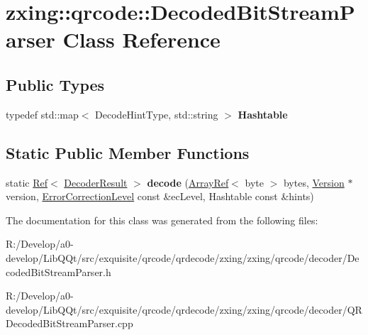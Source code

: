 \hypertarget{classzxing_1_1qrcode_1_1_decoded_bit_stream_parser}{}\section{zxing\+:\+:qrcode\+:\+:Decoded\+Bit\+Stream\+Parser Class Reference}
\label{classzxing_1_1qrcode_1_1_decoded_bit_stream_parser}
\subsection*{Public Types}
\begin{DoxyCompactItemize}
\item 
\mbox{\label{classzxing_1_1qrcode_1_1_decoded_bit_stream_parser_a7390b37faca4378490ad54100f5e540a}} 
typedef std\+::map$<$ Decode\+Hint\+Type, std\+::string $>$ {\bfseries Hashtable}
\end{DoxyCompactItemize}
\subsection*{Static Public Member Functions}
\begin{DoxyCompactItemize}
\item 
\mbox{\label{classzxing_1_1qrcode_1_1_decoded_bit_stream_parser_a1b315d15eadcde4b8c3716ff38f59d30}} 
static \mbox{\hyperlink{classzxing_1_1_ref}{Ref}}$<$ \mbox{\hyperlink{classzxing_1_1_decoder_result}{Decoder\+Result}} $>$ {\bfseries decode} (\mbox{\hyperlink{classzxing_1_1_array_ref}{Array\+Ref}}$<$ byte $>$ bytes, \mbox{\hyperlink{classzxing_1_1qrcode_1_1_version}{Version}} $\ast$version, \mbox{\hyperlink{classzxing_1_1qrcode_1_1_error_correction_level}{Error\+Correction\+Level}} const \&ec\+Level, Hashtable const \&hints)
\end{DoxyCompactItemize}


The documentation for this class was generated from the following files\+:\begin{DoxyCompactItemize}
\item 
R\+:/\+Develop/a0-\/develop/\+Lib\+Q\+Qt/src/exquisite/qrcode/qrdecode/zxing/zxing/qrcode/decoder/Decoded\+Bit\+Stream\+Parser.\+h\item 
R\+:/\+Develop/a0-\/develop/\+Lib\+Q\+Qt/src/exquisite/qrcode/qrdecode/zxing/zxing/qrcode/decoder/Q\+R\+Decoded\+Bit\+Stream\+Parser.\+cpp\end{DoxyCompactItemize}
